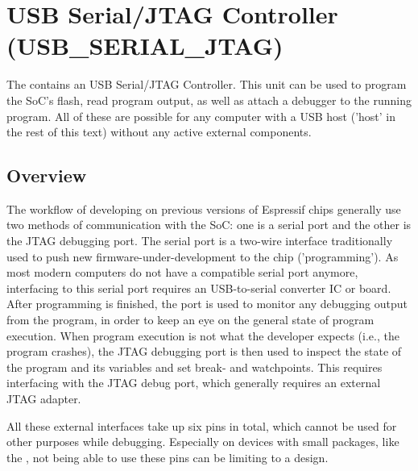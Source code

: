 \documentclass[main\_\_EN.tex]{subfiles}
\begin{document}

\ifglobal
\else
    {\let\clearpage\relax \listoftodos}
    \tableofcontents
\fi




\chapter{USB Serial/JTAG Controller (USB\_SERIAL\_JTAG)}
\label{mod:usbserialjtag}
\hypertarget{usbserialjtag}{}

The \chipname{} contains an USB Serial/JTAG Controller. This unit can be used to program the SoC's flash, read program output, as well as attach a debugger to the running program. All of these are possible for any computer with a USB host ('host' in the rest of this text) without any active external components.

\section{Overview}

The workflow of developing on previous versions of Espressif chips generally use two methods of communication with the SoC: one is a serial port and the other is the JTAG debugging port. The serial port is a two-wire interface traditionally used to push new firmware-under-development to the chip ('programming'). As most modern computers do not have a compatible serial port anymore, interfacing to this serial port requires an USB-to-serial converter IC or board. After programming is finished, the port is used to monitor any debugging output from the program, in order to keep an eye on the general state of program execution. When program execution is not what the developer expects (i.e., the program crashes), the JTAG debugging port is then used to inspect the state of the program and its variables and set break- and watchpoints. This requires interfacing with the JTAG debug port, which generally requires an external JTAG adapter.

All these external interfaces take up six pins in total, which cannot be used for other purposes while debugging. Especially on devices with small packages, like the \chipname{}, not being able to use these pins can be limiting to a design.
\end{document}
